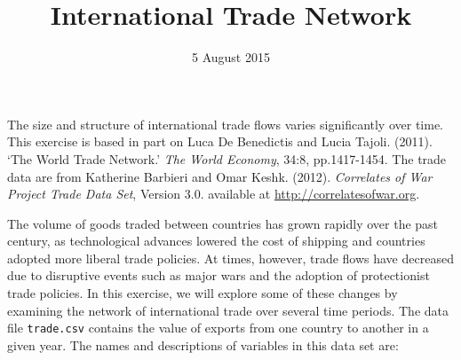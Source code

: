 \documentclass[]{article}
\title{International Trade Network}
\author{}
\date{5 August 2015}
\begin{document}
\maketitle


The size and structure of international trade flows varies significantly
over time. This exercise is based in part on Luca De Benedictis and
Lucia Tajoli. (2011). `The World Trade Network.' \emph{The World
Economy}, 34:8, pp.1417-1454. The trade data are from Katherine Barbieri
and Omar Keshk. (2012). \emph{Correlates of War Project Trade Data Set},
Version 3.0. available at
\href{http://correlatesofwar.org}{\url{http://correlatesofwar.org}}.

The volume of goods traded between countries has grown rapidly over the
past century, as technological advances lowered the cost of shipping and
countries adopted more liberal trade policies. At times, however, trade
flows have decreased due to disruptive events such as major wars and the
adoption of protectionist trade policies. In this exercise, we will
explore some of these changes by examining the network of international
trade over several time periods. The data file \texttt{trade.csv}
contains the value of exports from one country to another in a given
year. The names and descriptions of variables in this data set are:
\end{document}
